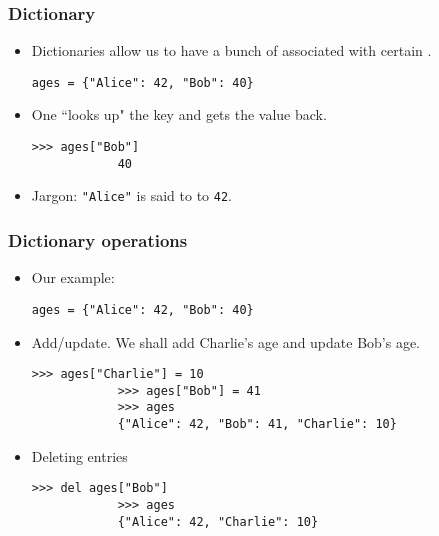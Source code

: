 \documentclass[presentation]{beamer}
\begin{document}
	\begin{frame}[fragile]
		\frametitle{Dictionary}
		
		\begin{itemize}
			\item Dictionaries allow us to have a bunch of  associated with certain .
			\begin{lstlisting}[xleftmargin=\dimexpr-\leftmargini]
			ages = {"Alice": 42, "Bob": 40}
			\end{lstlisting}
			
			\item One ``looks up" the key and gets the value back.
			\begin{lstlisting}[xleftmargin=\dimexpr-\leftmargini]
			>>> ages["Bob"]
			40\end{lstlisting}
			
			\item Jargon: \lstinline|"Alice"| is said to  to \lstinline|42|.
			
			
		\end{itemize}
	\end{frame}
	
	\begin{frame}[fragile]
		\frametitle{Dictionary operations}
		
		\begin{itemize}
			\item Our example:
			\begin{lstlisting}[xleftmargin=\dimexpr-\leftmargini]
			ages = {"Alice": 42, "Bob": 40}
			\end{lstlisting}
			\item Add/update. We shall add Charlie's age and update Bob's age.
			\begin{lstlisting}[xleftmargin=\dimexpr-\leftmargini]
			>>> ages["Charlie"] = 10
			>>> ages["Bob"] = 41
			>>> ages
			{"Alice": 42, "Bob": 41, "Charlie": 10}
			\end{lstlisting}
			
			\item Deleting entries
			\begin{lstlisting}[xleftmargin=\dimexpr-\leftmargini]
			>>> del ages["Bob"]
			>>> ages
			{"Alice": 42, "Charlie": 10}
			\end{lstlisting}
			
		\end{itemize}
	\end{frame}
	
\end{document}
